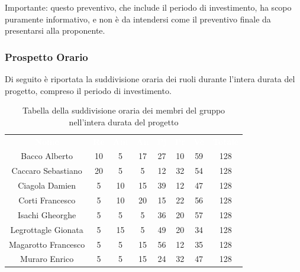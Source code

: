 Importante: questo preventivo, che include il periodo di investimento, ha scopo puramente informativo, e non è da intendersi come il preventivo finale da presentarsi alla proponente.
\subsubsection{Prospetto Orario}
Di seguito è riportata la suddivisione oraria dei ruoli durante l'intera durata del progetto, compreso il periodo di investimento.




\begin{table}[H]	
	\begin{center}
	    \begin{tabular}{cccccccc}
			\rowcolor{greySWEight}
			\textcolor{white}{\textbf{Nome}} & \textcolor{white}{\textbf{Re}} & \textcolor{white}{\textbf{Am}} & \textcolor{white}{\textbf{An}} & \textcolor{white}{\textbf{Pj}} & \textcolor{white}{\textbf{Pr}} & \textcolor{white}{\textbf{Ve}} & \textcolor{white}{\textbf{Totale}}
			\\
			Bacco Alberto & 10 & 5 & 17 & 27 & 10 & 59 & 128 \\
			Caccaro Sebastiano & 20 & 5 & 5 & 12 & 32 & 54 & 128 \\
			Ciagola Damien & 5 & 10 & 15 & 39 & 12 & 47 & 128 \\
			Corti Francesco & 5 & 10 & 20 & 15 & 22 & 56 & 128 \\
			Isachi Gheorghe & 5 & 5 & 5 & 36 & 20 & 57 & 128 \\
			Legrottagle Gionata & 5 & 15 & 5 & 49 & 20 & 34 & 128 \\
			Magarotto Francesco & 5 & 5 & 15 & 56 & 12 & 35 & 128 \\
			Muraro Enrico & 5 & 5 & 15 & 24 & 32 & 47 & 128 \\
			\end{tabular}
	    \caption{Tabella della suddivisione oraria dei membri del gruppo nell'intera durata del progetto} \label{tab:tabellaProgInt} 
	\end{center}
\end{table}


